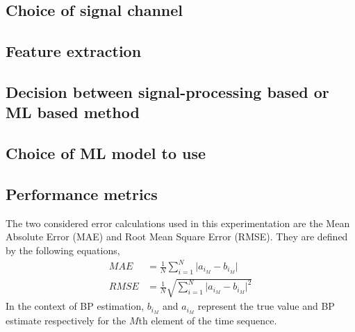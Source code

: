 \subsection{Choice of signal channel}

\subsection{Feature extraction}

\subsection{Decision between signal-processing based or ML based method}

\subsection{Choice of ML model to use}

\subsection{Performance metrics}
The two considered error calculations used in this experimentation are the Mean Absolute Error 
(MAE) and Root Mean Square Error (RMSE). They are defined by the following equations, 
\begin{align}
    MAE &= \frac{1}{N} \sum_{i=1}^N \lvert a_{i_{M}} - b_{i_{M}} \rvert \\
    RMSE &= \frac{1}{N} \sqrt{\sum_{i=1}^N \lvert a_{i_{M}} - b_{i_{M}} \rvert^2}
\end{align}\noindent In the context of BP estimation, $b_{i_{M}}$ and $a_{i_{M}}$ represent the true 
value and BP estimate respectively for the $M$th element of the time sequence.

